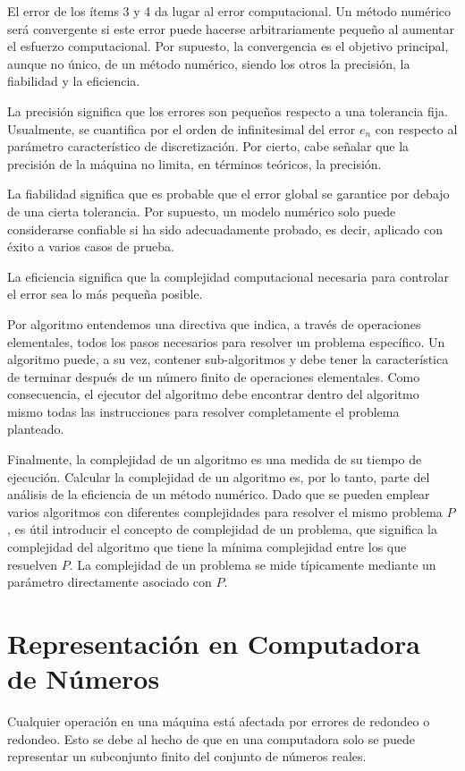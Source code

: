 El error de los ítems 3 y 4 da lugar al error computacional. Un método numérico será convergente si este error puede hacerse arbitrariamente pequeño al aumentar el esfuerzo computacional. Por supuesto, la convergencia es el objetivo principal, aunque no único, de un método numérico, siendo los otros la precisión, la fiabilidad y la eficiencia.

La precisión significa que los errores son pequeños respecto a una tolerancia fija. Usualmente, se cuantifica por el orden de infinitesimal del error $e_n$ con respecto al parámetro característico de discretización. Por cierto, cabe señalar que la precisión de la máquina no limita, en términos teóricos, la precisión.

La fiabilidad significa que es probable que el error global se garantice por debajo de una cierta tolerancia. Por supuesto, un modelo numérico solo puede considerarse confiable si ha sido adecuadamente probado, es decir, aplicado con éxito a varios casos de prueba.

La eficiencia significa que la complejidad computacional necesaria para controlar el error sea lo más pequeña posible.

Por algoritmo entendemos una directiva que indica, a través de operaciones elementales, todos los pasos necesarios para resolver un problema específico. Un algoritmo puede, a su vez, contener sub-algoritmos y debe tener la característica de terminar después de un número finito de operaciones elementales. Como consecuencia, el ejecutor del algoritmo debe encontrar dentro del algoritmo mismo todas las instrucciones para resolver completamente el problema planteado.

Finalmente, la complejidad de un algoritmo es una medida de su tiempo de ejecución. Calcular la complejidad de un algoritmo es, por lo tanto, parte del análisis de la eficiencia de un método numérico. Dado que se pueden emplear varios algoritmos con diferentes complejidades para resolver el mismo problema $P$, es útil introducir el concepto de complejidad de un problema, que significa la complejidad del algoritmo que tiene la mínima complejidad entre los que resuelven $P$. La complejidad de un problema se mide típicamente mediante un parámetro directamente asociado con $P$.

\section{Representación en Computadora de Números}
Cualquier operación en una máquina está afectada por errores de redondeo o redondeo. Esto se debe al hecho de que en una computadora solo se puede representar un subconjunto finito del conjunto de números reales.

